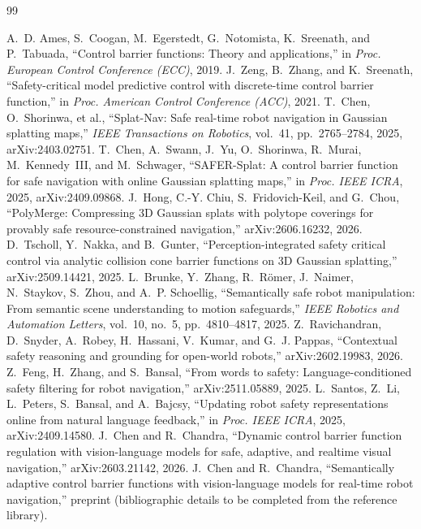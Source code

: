 \documentclass[10pt,a4paper]{article}
\begin{document}
\begin{thebibliography}{99}\small

 A.~D. Ames, S.~Coogan, M.~Egerstedt, G.~Notomista, K.~Sreenath, and P.~Tabuada, ``Control barrier functions: Theory and applications,'' in \emph{Proc. European Control Conference (ECC)}, 2019.
 J.~Zeng, B.~Zhang, and K.~Sreenath, ``Safety-critical model predictive control with discrete-time control barrier function,'' in \emph{Proc. American Control Conference (ACC)}, 2021.
 T.~Chen, O.~Shorinwa, et al., ``Splat-Nav: Safe real-time robot navigation in Gaussian splatting maps,'' \emph{IEEE Transactions on Robotics}, vol.~41, pp.~2765--2784, 2025, arXiv:2403.02751.
 T.~Chen, A.~Swann, J.~Yu, O.~Shorinwa, R.~Murai, M.~Kennedy~III, and M.~Schwager, ``SAFER-Splat: A control barrier function for safe navigation with online Gaussian splatting maps,'' in \emph{Proc. IEEE ICRA}, 2025, arXiv:2409.09868.
 J.~Hong, C.-Y. Chiu, S.~Fridovich-Keil, and G.~Chou, ``PolyMerge: Compressing 3D Gaussian splats with polytope coverings for provably safe resource-constrained navigation,'' arXiv:2606.16232, 2026.
 D.~Tscholl, Y.~Nakka, and B.~Gunter, ``Perception-integrated safety critical control via analytic collision cone barrier functions on 3D Gaussian splatting,'' arXiv:2509.14421, 2025.
 L.~Brunke, Y.~Zhang, R.~R\"omer, J.~Naimer, N.~Staykov, S.~Zhou, and A.~P. Schoellig, ``Semantically safe robot manipulation: From semantic scene understanding to motion safeguards,'' \emph{IEEE Robotics and Automation Letters}, vol.~10, no.~5, pp.~4810--4817, 2025.
 Z.~Ravichandran, D.~Snyder, A.~Robey, H.~Hassani, V.~Kumar, and G.~J. Pappas, ``Contextual safety reasoning and grounding for open-world robots,'' arXiv:2602.19983, 2026.
 Z.~Feng, H.~Zhang, and S.~Bansal, ``From words to safety: Language-conditioned safety filtering for robot navigation,'' arXiv:2511.05889, 2025.
 L.~Santos, Z.~Li, L.~Peters, S.~Bansal, and A.~Bajcsy, ``Updating robot safety representations online from natural language feedback,'' in \emph{Proc. IEEE ICRA}, 2025, arXiv:2409.14580.
 J.~Chen and R.~Chandra, ``Dynamic control barrier function regulation with vision-language models for safe, adaptive, and realtime visual navigation,'' arXiv:2603.21142, 2026.
 J.~Chen and R.~Chandra, ``Semantically adaptive control barrier functions with vision-language models for real-time robot navigation,'' preprint (bibliographic details to be completed from the reference library).

\end{thebibliography}
\end{document}
